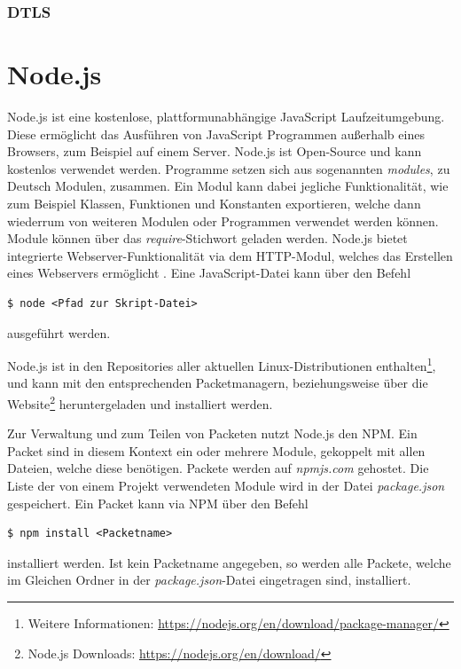 \subsubsection{DTLS}

\section{Node.js}
Node.js ist eine kostenlose, plattformunabhängige JavaScript Laufzeitumgebung.
Diese ermöglicht das Ausführen von JavaScript Programmen außerhalb eines Browsers, zum Beispiel auf einem Server. Node.js ist Open-Source und kann kostenlos verwendet werden. Programme setzen sich aus sogenannten \textit{modules}, zu Deutsch Modulen, zusammen. Ein Modul kann dabei jegliche Funktionalität, wie zum Beispiel Klassen, Funktionen und Konstanten exportieren, welche dann wiederrum von weiteren Modulen oder Programmen verwendet werden können. Module können über das \textit{require}-Stichwort geladen werden. Node.js bietet integrierte Webserver-Funktionalität via dem \acs{HTTP}-Modul, welches das Erstellen eines Webservers ermöglicht \cite{nodejs}. Eine JavaScript-Datei kann über den Befehl
\lstset{style=STYLE_COMMAND_LINE_ARGUMENT_SINGLE_LINE}
\begin{lstlisting}[belowskip=-0.8 \baselineskip]
$ node <Pfad zur Skript-Datei>
\end{lstlisting}
ausgeführt werden.\par 

Node.js ist in den Repositories aller aktuellen Linux-Distributionen enthalten\footnote{Weitere Informationen: \url{https://nodejs.org/en/download/package-manager/}}, und kann mit den entsprechenden Packetmanagern, beziehungsweise über die Website\footnote{Node.js Downloads: \url{https://nodejs.org/en/download/}} heruntergeladen und installiert werden.\par

Zur Verwaltung und zum Teilen von Packeten nutzt Node.js den \ac{NPM}. Ein Packet sind in diesem Kontext ein oder mehrere Module, gekoppelt mit allen Dateien, welche diese benötigen. Packete werden auf \textit{npmjs.com} gehostet. Die Liste der von einem Projekt verwendeten Module wird in der Datei \textit{package.json} gespeichert. Ein Packet kann via NPM über den Befehl
\lstset{style=STYLE_COMMAND_LINE_ARGUMENT_SINGLE_LINE}
\begin{lstlisting}[belowskip=-0.8 \baselineskip]
$ npm install <Packetname>
\end{lstlisting}
installiert werden. Ist kein Packetname angegeben, so werden alle Packete, welche im Gleichen Ordner in der \textit{package.json}-Datei eingetragen sind, installiert.

